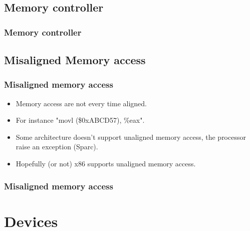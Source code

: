 
\subsection{Memory controller}
\begin{frame}
  \frametitle{Memory controller}
  \begin{center}
  \end{center}
\end{frame}


\subsection{Misaligned Memory access}
\begin{frame}
\frametitle{Misaligned memory access}
  \begin{itemize}
    \item Memory access are not every time aligned.
    \item For instance "movl (\$0xABCD57), \%eax".
    \item Some architecture doesn't support unaligned memory access, the
    processor raise an exception (Sparc).
    \item Hopefully (or not) x86 supports unaligned memory access.
  \end{itemize}
\end{frame}

\begin{frame}
  \frametitle{Misaligned memory access}
  \begin{center}
\begin{overlayarea}{10cm}{10cm}
\end{overlayarea}
  \end{center}
\end{frame}

\section{Devices}

